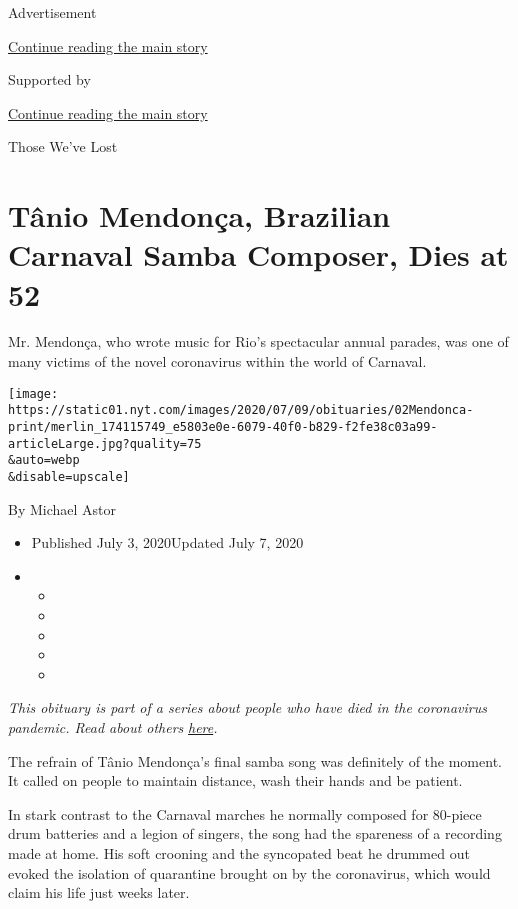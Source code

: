 Advertisement

\protect\hyperlink{after-top}{Continue reading the main story}

Supported by

\protect\hyperlink{after-sponsor}{Continue reading the main story}

Those We've Lost

\hypertarget{tuxe2nio-mendonuxe7a-brazilian-carnaval-samba-composer-dies-at-52}{%
\section{Tânio Mendonça, Brazilian Carnaval Samba Composer, Dies at
52}\label{tuxe2nio-mendonuxe7a-brazilian-carnaval-samba-composer-dies-at-52}}

Mr. Mendonça, who wrote music for Rio's spectacular annual parades, was
one of many victims of the novel coronavirus within the world of
Carnaval.

\texttt{[image: https://static01.nyt.com/images/2020/07/09/obituaries/02Mendonca-print/merlin\_174115749\_e5803e0e-6079-40f0-b829-f2fe38c03a99-articleLarge.jpg?quality=75\\\&auto=webp\\\&disable=upscale]}

By Michael Astor

\begin{itemize}
\item
  Published July 3, 2020Updated July 7, 2020
\item
  \begin{itemize}
  \item
  \item
  \item
  \item
  \item
  \end{itemize}
\end{itemize}

\emph{This obituary is part of a series about people who have died in
the coronavirus pandemic. Read about others}
\href{https://www.nytimes.com/interactive/2020/obituaries/people-died-coronavirus-obituaries.html}{\emph{here}}\emph{.}

The refrain of Tânio Mendonça's final samba song was definitely of the
moment. It called on people to maintain distance, wash their hands and
be patient.

In stark contrast to the Carnaval marches he normally composed for
80-piece drum batteries and a legion of singers, the song had the
spareness of a recording made at home. His soft crooning and the
syncopated beat he drummed out evoked the isolation of quarantine
brought on by the coronavirus, which would claim his life just weeks
later.

